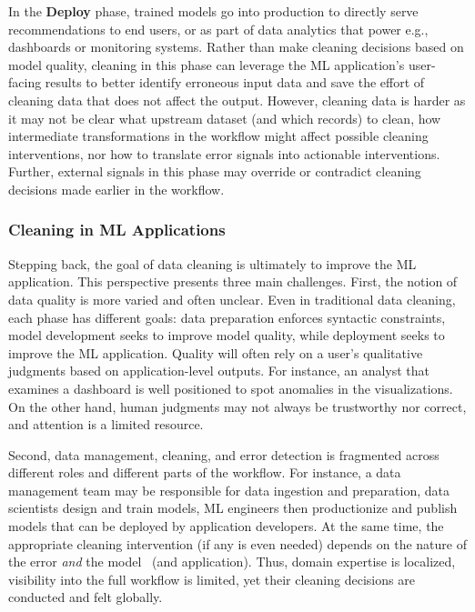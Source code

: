 \documentclass[11pt,dvipsnames]{article}
\begin{document}
In the \textbf{Deploy} phase, trained models go into production to directly serve recommendations to end users, or as part of data analytics that power e.g., dashboards or monitoring systems. Rather than make cleaning decisions based on model quality, cleaning in this phase can leverage the ML application's user-facing results to better identify erroneous input data and save the effort of cleaning data that does not affect the output.  
However, cleaning data is harder as it may not be clear what upstream dataset (and which records) to clean, how intermediate transformations in the workflow might affect possible cleaning interventions, nor how to translate error signals into actionable interventions.  Further, external signals in this phase may override or contradict cleaning decisions made earlier in the workflow.

\subsubsection{Cleaning in ML Applications}

Stepping back, the goal of data cleaning is ultimately to improve the ML application.  This perspective presents three main challenges.  
First, the notion of data quality is more varied and often unclear. Even in traditional data cleaning, each phase has different goals: data preparation enforces syntactic constraints, model development seeks to improve model quality, while deployment seeks to improve the ML application.  Quality will often rely on a user's qualitative judgments based on application-level outputs. For instance, an analyst that examines a dashboard is well positioned to spot anomalies in the visualizations.  On the other hand, human judgments may not always be trustworthy nor correct, and attention is a limited resource.   

Second, data management, cleaning, and error detection is fragmented across different roles and different parts of the workflow.  For instance, a data management team may be responsible for data ingestion and preparation, data scientists design and train models, ML engineers then productionize and publish models that can be deployed by application developers.  At the same time, the appropriate cleaning intervention (if any is even needed) depends on the nature of the error {\it and} the model~\cite{liu_robust_2020,Zhu2020WhenDT,Diakonikolas2019SeverAR} (and application).    Thus, domain expertise is localized, visibility into the full workflow is limited, yet their cleaning decisions are conducted and felt globally.   
\end{document}
